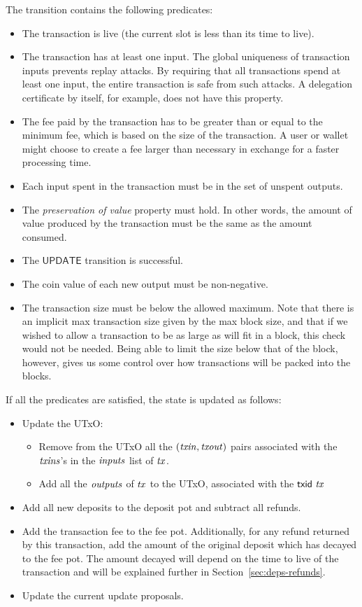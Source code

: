 The transition contains the following predicates:

\begin{itemize}
  \item
    The transaction is live (the current slot is less than its time to live).
  \item
    The transaction has at least one input.
    The global uniqueness of transaction inputs prevents replay attacks.
    By requiring that all transactions spend at least one input,
    the entire transaction is safe from such attacks.
    A delegation certificate by itself, for example, does not have this property.
  \item
    The fee paid by the transaction has to be greater than or equal to the minimum fee,
    which is based on the size of the transaction.
    A user or wallet might choose to create a fee larger than necessary
    in exchange for a faster processing time.
  \item
    Each input spent in the transaction must be in the set of unspent
    outputs.
  \item
    The \textit{preservation of value} property must hold.
    In other words, the amount of value produced by the transaction must be the same as
    the amount consumed.
  \item
    The $\mathsf{UPDATE}$ transition is successful.
  \item
    The coin value of each new output must be non-negative.
  \item
    The transaction size must be below the allowed maximum.
    Note that there is an implicit max transaction size given by the max block size,
    and that if we wished to allow a transaction to be as large as will fit in a block, this
    check would not be needed.
    Being able to limit the size below that of the block, however, gives us some
    control over how transactions will be packed into the blocks.
\end{itemize}
If all the predicates are satisfied, the state is updated as follows:

\begin{itemize}
  \item Update the UTxO:
    \begin{itemize}
      \item Remove from the UTxO all the $(\mathit{txin}, \mathit{txout})$ pairs
        associated with the $\mathit{txins}$'s in the $\mathit{inputs}$ list of $\mathit{tx}$.
      \item Add all the $\mathit{outputs}$ of $\mathit{tx}$ to the
        UTxO, associated with the $\mathsf{txid}~\mathit{tx}$
    \end{itemize}
  \item Add all new deposits to the deposit pot and subtract all refunds.
  \item Add the transaction fee to the fee pot. Additionally, for any refund
    returned by this transaction, add the amount of the original deposit
    which has decayed to the fee pot.
    The amount decayed will depend on the time to live of the transaction
    and will be explained further in Section~\ref{sec:deps-refunds}.
  \item Update the current update proposals.
\end{itemize}

